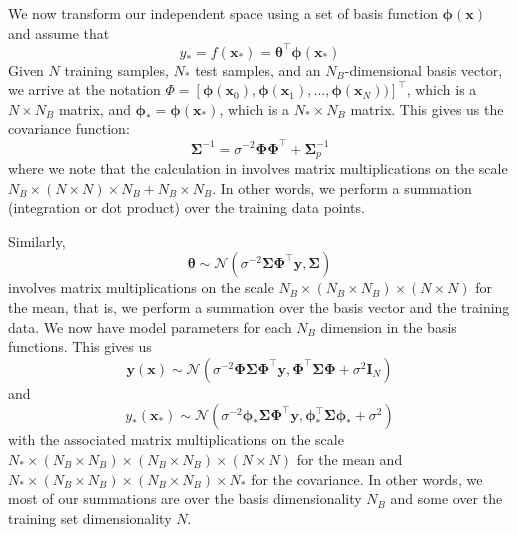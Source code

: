 \documentclass{article}
\begin{document}
We now transform our independent space using a set of basis function $\boldsymbol{\phi}(\mathbf{x})$ and assume that
\begin{equation}
    y_\ast=f(\mathbf{x_\ast})=\boldsymbol{\theta}^\top\boldsymbol{\phi}(\mathbf{x_\ast})
\end{equation} 
Given $N$ training samples, $N_\ast$ test samples, and an $N_B$-dimensional basis vector, we arrive at the notation $\Phi=[\boldsymbol{\phi}(\mathbf{x}_0),\boldsymbol{\phi}(\mathbf{x}_1),\dots,\boldsymbol{\phi}(\mathbf{x}_{N}))]^\top$, which is a $N \times N_B$ matrix, and  $\boldsymbol{\phi}_\ast=\boldsymbol{\phi}(\mathbf{x}_\ast)$, which is a $N_\ast \times N_B$ matrix. This gives us the covariance function:
\begin{equation}
\label{covariance_matrix}
    \boldsymbol{\Sigma}^{-1} = \sigma^{-2} \boldsymbol{\Phi}  \boldsymbol{\Phi}^\top +  \boldsymbol{\Sigma}_p^{-1}
\end{equation} 
where we note that the calculation in involves matrix multiplications on the scale $N_B \times (N \times N) \times N_B + N_B \times N_B$. In other words, we perform a summation (integration or dot product) over the training data points.

Similarly,
\begin{equation}
\label{theta_distribution}
    \boldsymbol{\theta}\sim\mathcal{N}( \sigma^{-2}\boldsymbol{\Sigma} \boldsymbol{\Phi}^\top \mathbf{y},\boldsymbol{\Sigma})
\end{equation} 
involves matrix multiplications on the scale $N_B \times (N_B \times N_B) \times (N \times N)$ for the mean, that is, we perform a summation over the basis vector and the training data. We now have model parameters for each $N_B$ dimension in the basis functions. This gives us
\begin{equation}
\label{BLR_posterior}
    \mathbf{y}(\mathbf{x})\sim\mathcal{N}\left(\sigma^{-2}\boldsymbol{\Phi}  \boldsymbol{\Sigma} \boldsymbol{\Phi}^\top\mathbf{y} ,\boldsymbol{\Phi}^\top\boldsymbol{\Sigma}\boldsymbol{\Phi}+\sigma^2 \mathbf{I}_N\right)
\end{equation} 
and
\begin{equation}
\label{BLR_posterior}
    y_\ast(\mathbf{x}_\ast)\sim\mathcal{N}\left(\sigma^{-2}\boldsymbol{\phi}_\ast  \boldsymbol{\Sigma} \boldsymbol{\Phi}^\top\mathbf{y} ,\boldsymbol{\phi}^\top_\ast \boldsymbol{\Sigma}\boldsymbol{\phi}_\ast+ \sigma^2\right)
\end{equation} 
with the associated matrix multiplications on the scale $N_\ast \times(N_B \times N_B) \times (N_B \times N_B) \times (N \times N)$ for the mean and $N_\ast \times (N_B \times N_B) \times (N_B \times N_B) \times N_\ast$ for the covariance. In other words, we most of our summations are over the basis dimensionality $N_B$ and some over the training set dimensionality $N$.
\end{document}
